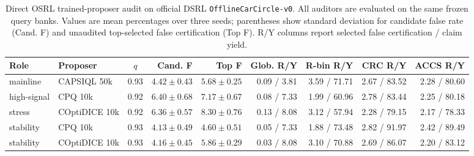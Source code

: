 \begin{table}[t]
\centering
\small
\setlength{\tabcolsep}{2.5pt}
\begin{tabular}{llcrrrrrr}
\toprule
Role & Proposer & $q$ & Cand. F & Top F & Glob. R/Y & R-bin R/Y & CRC R/Y & ACCS R/Y \\
\midrule
mainline & CAPSIQL 50k & 0.93 & $4.42{\pm}0.43$ & $5.68{\pm}0.25$ & 0.09 / 3.81 & 3.59 / 71.71 & 2.67 / 83.52 & 2.28 / 80.60 \\
high-signal & CPQ 10k & 0.92 & $6.40{\pm}0.68$ & $7.17{\pm}0.67$ & 0.08 / 7.33 & 1.99 / 60.96 & 2.78 / 83.44 & 2.25 / 80.18 \\
stress & COptiDICE 10k & 0.92 & $6.36{\pm}0.57$ & $8.30{\pm}0.76$ & 0.13 / 8.08 & 3.12 / 57.94 & 2.28 / 79.15 & 2.17 / 78.33 \\
\midrule
stability & CPQ 10k & 0.93 & $4.13{\pm}0.49$ & $4.60{\pm}0.51$ & 0.05 / 7.33 & 1.88 / 73.48 & 2.82 / 91.97 & 2.42 / 89.49 \\
stability & COptiDICE 10k & 0.93 & $4.16{\pm}0.45$ & $5.86{\pm}0.29$ & 0.03 / 8.08 & 3.10 / 70.88 & 2.69 / 86.07 & 2.20 / 83.12 \\
\bottomrule
\end{tabular}
\caption{Direct OSRL trained-proposer audit on official DSRL \texttt{OfflineCarCircle-v0}. All auditors are evaluated on the same frozen query banks. Values are mean percentages over three seeds; parentheses show standard deviation for candidate false rate (Cand. F) and unaudited top-selected false certification (Top F). R/Y columns report selected false certification / claim yield.}
\label{tab:direct-osrl-main}
\end{table}
